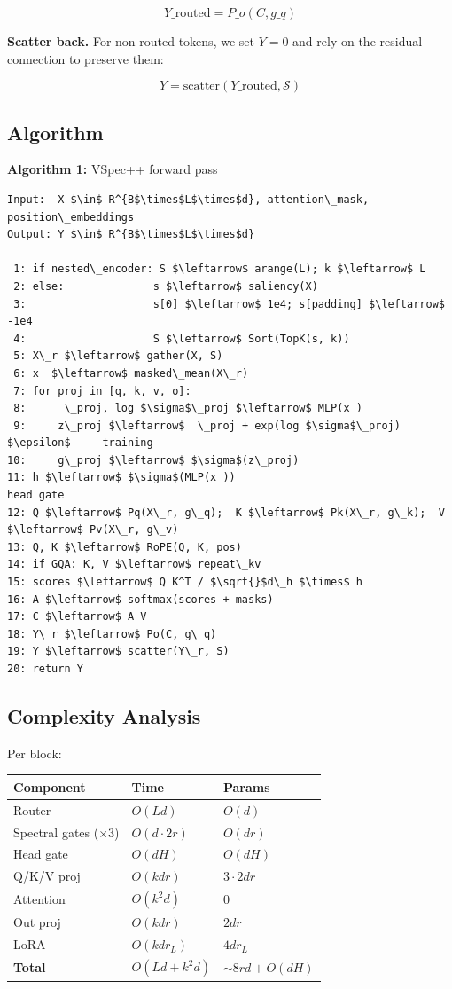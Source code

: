 \[
Y\_\text{routed} = P\_o(C, g\_q)
\tag{4.18}
\]

\textbf{Scatter back.} For non-routed tokens, we set $Y = 0$ and rely on the 
residual connection to preserve them:

\[
Y = \text{scatter}(Y\_\text{routed}, \mathcal{S})
\tag{4.19}
\]

\subsection{Algorithm}

\textbf{Algorithm 1:} VSpec++ forward pass
\begin{lstlisting}
Input:  X $\in$ R^{B$\times$L$\times$d}, attention\_mask, position\_embeddings
Output: Y $\in$ R^{B$\times$L$\times$d}

 1: if nested\_encoder: S $\leftarrow$ arange(L); k $\leftarrow$ L
 2: else:              s $\leftarrow$ saliency(X)
 3:                    s[0] $\leftarrow$ 1e4; s[padding] $\leftarrow$ -1e4
 4:                    S $\leftarrow$ Sort(TopK(s, k))
 5: X\_r $\leftarrow$ gather(X, S)
 6: x  $\leftarrow$ masked\_mean(X\_r)
 7: for proj in [q, k, v, o]:
 8:      \_proj, log $\sigma$\_proj $\leftarrow$ MLP(x )
 9:     z\_proj $\leftarrow$  \_proj + exp(log $\sigma$\_proj)   $\epsilon$     training
10:     g\_proj $\leftarrow$ $\sigma$(z\_proj)
11: h $\leftarrow$ $\sigma$(MLP(x ))                                 head gate
12: Q $\leftarrow$ Pq(X\_r, g\_q);  K $\leftarrow$ Pk(X\_r, g\_k);  V $\leftarrow$ Pv(X\_r, g\_v)
13: Q, K $\leftarrow$ RoPE(Q, K, pos)
14: if GQA: K, V $\leftarrow$ repeat\_kv
15: scores $\leftarrow$ Q K^T / $\sqrt{}$d\_h $\times$ h
16: A $\leftarrow$ softmax(scores + masks)
17: C $\leftarrow$ A V
18: Y\_r $\leftarrow$ Po(C, g\_q)
19: Y $\leftarrow$ scatter(Y\_r, S)
20: return Y
\end{lstlisting}

\subsection{Complexity Analysis}

Per block:

\begin{table}[H]
\centering
\small
\begin{tabular}{lll}
\toprule
\textbf{Component} & \textbf{Time} & \textbf{Params} \\
\midrule
Router & $O(L d)$ & $O(d)$ \\
Spectral gates ($\times$3) & $O(d \cdot 2r)$ & $O(dr)$ \\
Head gate & $O(d H)$ & $O(dH)$ \\
Q/K/V proj & $O(k d r)$ & $3 \cdot 2 d r$ \\
Attention & $O(k^2 d)$ & 0 \\
Out proj & $O(k d r)$ & $2 d r$ \\
LoRA & $O(k d r_L)$ & $4 d r_L$ \\
\textbf{Total} & $O(L d + k^2 d)$ & $\sim 8 r d + O(dH)$ \\
\bottomrule
\end{tabular}
\end{table}

